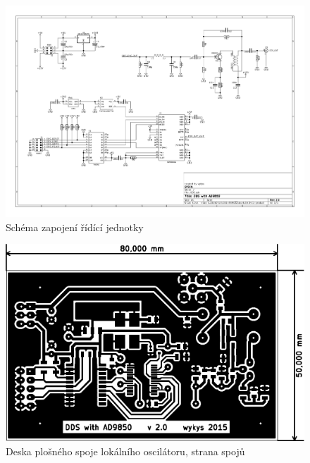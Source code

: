 \begin{landscape}
	\begin{figure}[h]
		\centering 	
		\includegraphics[height=\textwidth]{img/lo/sch.pdf}
		\caption{Schéma zapojení řídící jednotky}	
	\end{figure}
\end{landscape}
%

\begin{figure}[H]
	\centering
	\includegraphics[width=160mm]{img/lo/cu_b.pdf}
	\caption{Deska plošného spoje lokálního oscilátoru, strana spojů}    		
\end{figure}

